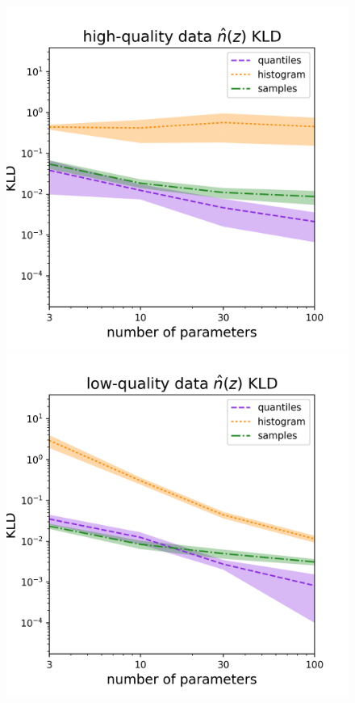 \documentclass[\docopts]{\docclass}
\begin{document}
\begin{figure}
  \begin{center}
    \includegraphics[width=\columnwidth]{figures/graham_nz_kld.pdf}    
\includegraphics[width=\columnwidth]{figures/schmidt_nz_kld.pdf}

\end{center}
\end{figure}
\end{document}

